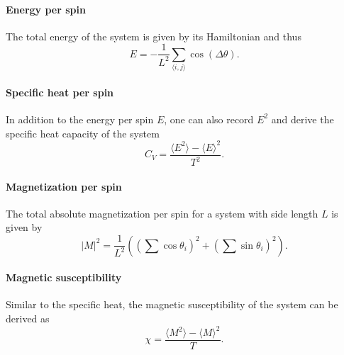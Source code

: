 		\paragraph{Energy per spin}
			The total energy of the system is given by its Hamiltonian and thus
			\begin{equation}\label{eq:energy}
				E = - \frac{1}{L^2} \sum_{\langle i, j \rangle}{\cos(\Delta \theta)}.
			\end{equation}
		
		\paragraph{Specific heat per spin}
			In addition to the energy per spin $E$, one can also record $E^2$ and derive the specific heat capacity of the system
			\begin{equation}\label{eq:specific_heat}
				C_V = \frac{\langle E^2 \rangle - \langle E \rangle^2}{T^2}.
			\end{equation}
		
		\paragraph{Magnetization per spin}
			The total absolute magnetization per spin for a system with side length $L$ is given by
			\begin{equation}\label{eq:magnetization}
				\lvert M \rvert^2 = \frac{1}{L^2} \left( (\sum{\cos\theta_i})^2 + (\sum{\sin\theta_i})^2 \right).
			\end{equation}
		
		\paragraph{Magnetic susceptibility}
			Similar to the specific heat, the magnetic susceptibility of the system can be derived as
			\begin{equation}\label{eq:magnetic_suceptibility}
				\chi = \frac{\langle M^2 \rangle - \langle M \rangle^2}{T}.
			\end{equation}
		
